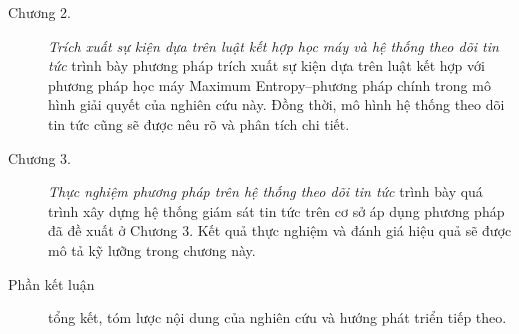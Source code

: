 \begin{preface}
\begin{description}

        \item[Chương 2.] \emph{Trích xuất sự kiện dựa trên luật kết hợp học máy
		và hệ thống theo dõi tin tức} trình bày phương pháp trích xuất sự kiện
        dựa trên luật kết hợp với phương pháp học máy Maximum Entropy--phương
        pháp chính trong mô hình giải quyết của nghiên cứu này. Đồng thời, mô
		hình hệ thống theo dõi tin tức cũng sẽ được nêu rõ và phân tích chi
		tiết.

        \item[Chương 3.] \emph{Thực nghiệm phương pháp trên hệ thống theo dõi
        tin tức} trình bày quá trình xây dựng hệ thống giám sát tin tức trên cơ
        sở  áp dụng phương pháp đã đề xuất ở Chương 3. Kết quả thực nghiệm và
        đánh giá hiệu quả sẽ được mô tả kỹ lưỡng trong chương này.


		\item[Phần kết luận] tổng kết, tóm lược nội dung của nghiên cứu
	    và hướng phát triển tiếp theo.
	\end{description}

\end{preface}
